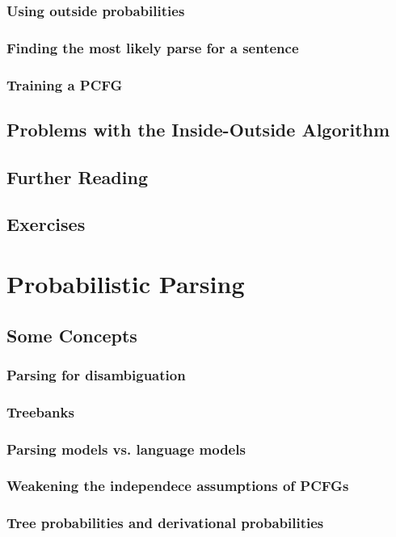 \documentclass[a4paper]{article}
\begin{document}
\subsubsection{Using outside probabilities}
\subsubsection{Finding the most likely parse for a sentence}
\subsubsection{Training a PCFG}
\subsection{Problems with the Inside-Outside Algorithm}
\subsection{Further Reading}
\subsection{Exercises}
\newpage
\section{Probabilistic Parsing}
\subsection{Some Concepts}
\subsubsection{Parsing for disambiguation}
\subsubsection{Treebanks}
\subsubsection{Parsing models vs. language models}
\subsubsection{Weakening the independece assumptions of PCFGs}
\subsubsection{Tree probabilities and derivational probabilities}
\end{document}
